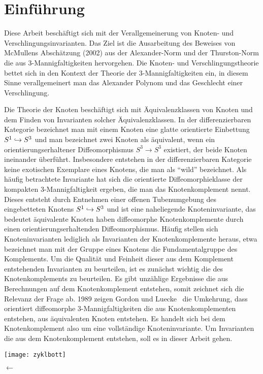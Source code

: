 \section{Einführung}
		
	\begin{minipage}[t][\textheight][t]{0.76\textwidth}

	Diese Arbeit beschäftigt sich mit der Verallgemeinerung von Knoten- und Verschlingungsinvarianten. Das Ziel ist die Ausarbeitung des Beweises von McMullens Abschätzung (2002) aus \cite{MCMULLEN.2002} der Alexander-Norm und der Thurston-Norm die aus 3-Mannigfaltigkeiten hervorgehen. Die Knoten- und Verschlingungstheorie bettet sich in den Kontext der Theorie der 3-Mannigfaltigkeiten ein, in diesem Sinne verallgemeinert man das Alexander Polynom und das Geschlecht einer Verschlingung.

	Die Theorie der Knoten beschäftigt sich mit Äquivalenzklassen von Knoten und dem Finden von Invarianten solcher Äquivalenzklassen. In der differenzierbaren Kategorie bezeichnet man mit einem Knoten eine glatte orientierte Einbettung $S^1\hookrightarrow S^3$ und man bezeichnet zwei Knoten als äquivalent, wenn ein orientierungserhaltener Diffeomorphismus $S^3\to S^3$ existiert, der beide Knoten ineinander überführt. Insbesondere entstehen in der differenzierbaren Kategorie keine exotischen Exemplare eines Knotens, die man als "`wild"' bezeichnet. Als häufig betrachtete Invariante hat sich die orientierte Diffeomorphieklasse der kompakten 3-Mannigfaltigkeit ergeben, die man das Knotenkomplement nennt. Dieses entsteht durch Entnehmen einer offenen Tubenumgebung des eingebetteten Knotens $S^1 \hookrightarrow S^3$ und ist eine naheliegende Knoteninvariante, das bedeutet äquivalente Knoten haben diffeomorphe Knotenkomplemente durch einen orientierungserhaltenden Diffeomorphismus. Häufig stellen sich Knoteninvarianten lediglich als Invarianten der Knotenkomplemente heraus, etwa bezeichnet man mit der Gruppe eines Knotens die Fundamentalgruppe des Komplements. Um die Qualität und Feinheit dieser aus dem Komplement entstehenden Invarianten zu beurteilen, ist es zunächst wichtig die des Knotenkomplements zu beurteilen. Es gibt unzählige Ergebnisse die aus Berechnungen auf dem Knotenkomplement entstehen, somit zeichnet sich die Relevanz der Frage ab. 1989 zeigen Gordon und Luecke~\cite{Gordon.1989} die Umkehrung, dass orientiert diffeomorphe 3-Mannigfaltigkeiten die aus Knotenkomplementen entstehen, aus äquivalenten Knoten entstehen. Es handelt sich bei dem Knotenkomplement also um eine vollständige Knoteninvariante. Um Invarianten die aus dem Knotenkomplement entstehen, soll es in dieser Arbeit gehen.


	\vfill
	\begin{minipage}[t]{0.7\textwidth}
		\texttt{[image: zyklbott]} 
	\end{minipage}
	\begin{minipage}[t]{0.2\textwidth}
	\vspace{-1cm}
	\huge$\longleftarrow$
	\vfill

	\end{minipage}
	\vspace{.63cm}
		 \label{fig:zykl}
	\end{minipage}

